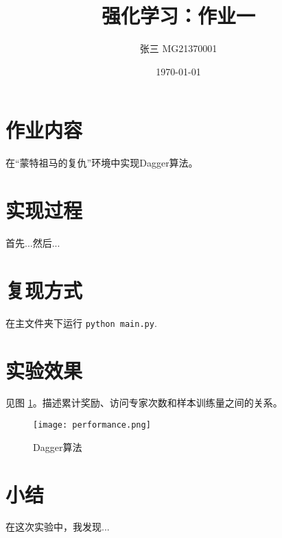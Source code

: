 \documentclass[a4paper,12pt]{article}
\begin{document}
\title{强化学习：作业一}

\author{张三 MG21370001}

\date{\today}

\maketitle

\section{作业内容}
在“蒙特祖马的复仇”环境中实现Dagger算法。

\section{实现过程}

首先...然后...

\section{复现方式}
在主文件夹下运行 \texttt{python main.py}.
\section{实验效果}
见图 \ref{performance}。描述累计奖励、访问专家次数和样本训练量之间的关系。
\begin{figure}[h!]
\centering
\texttt{[image: performance.png]}
\caption{Dagger算法}
\label{performance}
\end{figure}
\section{小结}
在这次实验中，我发现...
\end{document}
